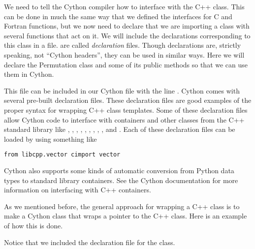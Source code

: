 We need to tell the Cython compiler how to interface with the C++ class.
This can be done in much the same way that we defined the interfaces for C and Fortran functions, but we now need to declare that we are importing a class with several functions that act on it.
We will include the declarations corresponding to this class in a  file.
 are called \emph{declaration} files.
Though declarations are, strictly speaking, not ``Cython headers'', they can be used in similar ways.
Here we will declare the Permutation class and some of its public methods so that we can use them in Cython.

This  file can be included in our Cython file with the line .
Cython comes with several pre-built declaration files.
These declaration files are good examples of the proper syntax for wrapping C++ class templates.
Some of these declaration files allow Cython code to interface with containers and other classes from the C++ standard library like , , , , , , , , , and .
Each of these declaration files can be loaded by using something like
\begin{lstlisting}
from libcpp.vector cimport vector
\end{lstlisting}
Cython also supports some kinds of automatic conversion from Python data types to standard library containers.
See the Cython documentation for more information on interfacing with C++ containers.

As we mentioned before, the general approach for wrapping a C++ class is to make a Cython class that wraps a pointer to the C++ class.
Here is an example of how this is done.

Notice that we included the declaration file for the class.

